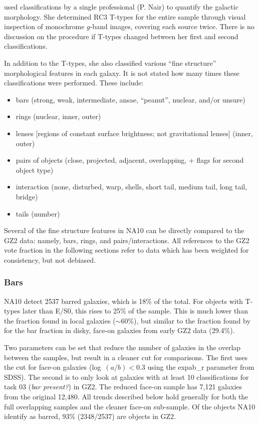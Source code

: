 \documentclass[useAMS,usenatbib]{mn2e}
\begin{document}
\citet{nai10} used classifications by a single professional (P. Nair) to quantify the galactic morphology. She determined RC3 T-types \citep{dev91} for the entire sample through visual inspection of monochrome $g$-band images, covering each source twice. There is no discussion on the procedure if T-types changed between her first and second classifications. 

In addition to the T-types, she also classified various ``fine structure'' morphological features in each galaxy. It is not stated how many times these classifications were performed. These include:

\begin{itemize}
	\item bars (strong, weak, intermediate, ansae, ``peanut'', nuclear, and/or unsure)
	\item rings (nuclear, inner, outer)
	\item lenses [regions of constant surface brightness; not gravitational lenses] (inner, outer)
	\item pairs of objects (close, projected, adjacent, overlapping, + flags for second object type)
	\item interaction (none, disturbed, warp, shells, short tail, medium tail, long tail, bridge)
	\item tails (number)
\end{itemize}

Several of the fine structure features in NA10 can be directly compared to the GZ2 data: namely, bars, rings, and pairs/interactions. All references to the GZ2 vote fraction in the following sections refer to data which has been weighted for consistency, but not debiased. 

\subsubsection{Bars}

NA10 detect 2537 barred galaxies, which is 18\% of the total. For objects with T-types later than E/S0, this rises to 25\% of the sample. This is much lower than the fraction found in local galaxies ($\sim60\%$), but similar to the fraction found by \citep{mas11c} for the bar fraction in disky, face-on galaxies from early GZ2 data (29.4\%). 

Two parameters can be set that reduce the number of galaxies in the overlap between the samples, but result in a cleaner cut for comparisons. The first uses the \citet{mas11c} cut for face-on galaxies (log~$(a/b) < 0.3$ using the {\sc expab\_r} parameter from SDSS). The second is to only look at galaxies with at least 10 classifications for task 03 ({\it bar present?}) in GZ2. The reduced face-on sample has 7,121 galaxies from the original 12,480. All trends described below hold generally for both the full overlapping samples and the cleaner face-on sub-sample. Of the objects NA10 identify as barred, 93\% (2348/2537) are objects in GZ2. 
\end{document}
